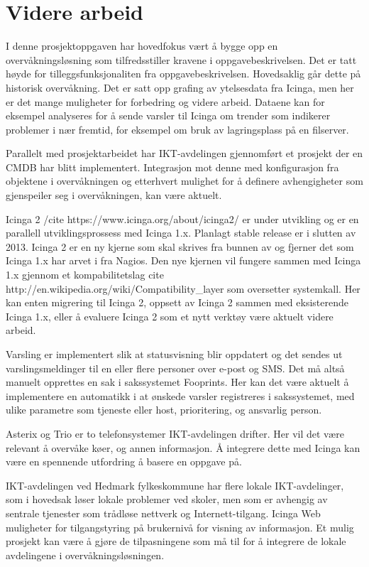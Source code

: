 \section{Videre arbeid}
I denne prosjektoppgaven har hovedfokus vært å bygge opp en overvåkningsløsning som tilfredsstiller kravene i oppgavebeskrivelsen. Det er tatt høyde for tilleggsfunksjonaliten fra oppgavebeskrivelsen. Hovedsaklig går dette på historisk overvåkning. Det er satt opp grafing av ytelsesdata fra Icinga, men her er det mange muligheter for forbedring og videre arbeid. Dataene kan for eksempel analyseres for å sende varsler til Icinga om trender som indikerer problemer i nær fremtid, for eksempel om bruk av lagringsplass på en filserver.

Parallelt med prosjektarbeidet har IKT-avdelingen gjennomført et prosjekt der en CMDB har blitt implementert. Integrasjon mot denne med konfigurasjon fra objektene i overvåkningen og etterhvert mulighet for å definere avhengigheter som gjenspeiler seg i overvåkningen, kan være aktuelt.

Icinga 2 /cite https://www.icinga.org/about/icinga2/ er under utvikling og er en parallell utviklingsprossess med Icinga 1.x. Planlagt stable release er i slutten av 2013. Icinga 2 er en ny kjerne som skal skrives fra bunnen av og fjerner det som Icinga 1.x har arvet i fra Nagios. Den nye kjernen vil fungere sammen med Icinga 1.x gjennom et kompabilitetslag cite http://en.wikipedia.org/wiki/Compatibility\_layer som oversetter systemkall. Her kan enten migrering til Icinga 2, oppsett av Icinga 2 sammen med eksisterende Icinga 1.x, eller å evaluere Icinga 2 som et nytt verktøy være aktuelt videre arbeid. 

Varsling er implementert slik at statusvisning blir oppdatert og det sendes ut varslingsmeldinger til en eller flere personer over e-post og SMS. Det må altså manuelt opprettes en sak i sakssystemet Fooprints. Her kan det være aktuelt å implementere en automatikk i at ønskede varsler registreres i sakssystemet, med ulike parametre som tjeneste eller host, prioritering, og ansvarlig person.

Asterix og Trio er to telefonsystemer IKT-avdelingen drifter. Her vil det være relevant å overvåke køer, og annen informasjon. Å integrere dette med Icinga kan være en spennende utfordring å basere en oppgave på.

IKT-avdelingen ved Hedmark fylkeskommune har flere lokale IKT-avdelinger, som i hovedsak løser lokale problemer ved skoler, men som er avhengig av sentrale tjenester som trådløse nettverk og Internett-tilgang. Icinga Web muligheter for tilgangstyring på brukernivå for visning av informasjon. Et mulig prosjekt kan være å gjøre de tilpasningene som må til for å integrere de lokale avdelingene i overvåkningsløsningen. 

